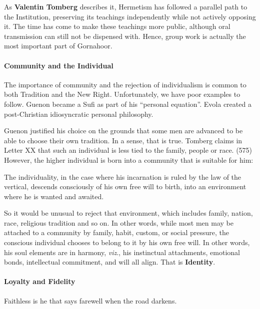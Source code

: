 As \textbf{Valentin Tomberg} describes it, Hermetism has followed a parallel path to the Institution, preserving its teachings independently while not actively opposing it. The time has come to make these teachings more public, although oral transmission can still not be dispensed with. Hence, group work is actually the most important part of Gornahoor.

\paragraph{Community and the Individual}


The importance of community and the rejection of individualism is common to both Tradition and the New Right. Unfortunately, we have poor examples to follow. Guenon became a Sufi as part of his ``personal equation''. Evola created a post-Christian idiosyncratic personal philosophy.

Guenon justified his choice on the grounds that some men are advanced to be able to choose their own tradition. In a sense, that is true. Tomberg claims in Letter XX that such an individual is less tied to the family, people or race. (575) However, the higher individual is born into a community that is suitable for him:

\begin{quotex}
The individuality, in the case where his incarnation is ruled by the law of the vertical, descends consciously of his own free will to birth, into an environment where he is wanted and awaited.
\end{quotex}


So it would be unusual to reject that environment, which includes family, nation, race, religious tradition and so on. In other words, while most men may be attached to a community by family, habit, custom, or social pressure, the conscious individual chooses to belong to it by his own free will. In other words, his soul elements are in harmony, \emph{viz}., his instinctual attachments, emotional bonds, intellectual commitment, and will all align. That is \textbf{Identity}.

\paragraph{Loyalty and Fidelity}


\begin{quotex}
Faithless is he that says farewell when the road darkens.
\end{quotex}


